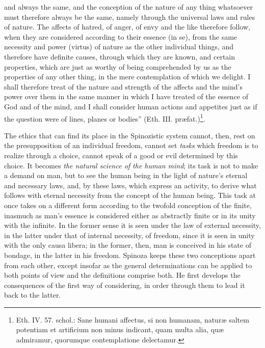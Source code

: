 \documentclass[12pt,a4paper,openany]{book}
\newcommand{\opage}[1]{\marginnote{\footnotesize\textit{[#1]}}}
\begin{document}
and always the same, and the conception of the nature of any thing
whatsoever must therefore always be the same, namely
through the universal laws and rules of nature. The affects of hatred, of anger,
of envy and the like therefore follow, when they are considered
according to their essence (in se), from the same necessity
and power (virtus) of nature as the other individual things,
and therefore have definite causes, through which they are known,
and certain properties, which are just as worthy of being comprehended
by us as the properties of any other thing, in the mere
contemplation of which we delight. I shall therefore treat of the
\opage{110}\setcounter{footnote}{0}nature and strength of the affects and the mind's power over them in the same
manner in which I have treated of the essence of God and of the mind,
and I shall consider human actions and
appetites just as if the question were of lines, planes or
bodies'' (Eth. III. præfat.)\footnote{Eth. IV. 57. schol.: Sane
humani affectus, si non humanam, naturæ saltem potentiam et
artificium non minus indicant, quam multa alia, quæ
admiramur, quorumque contemplatione delectamur.}.

The ethics that can find its place in the Spinozistic
system cannot, then, rest on the presupposition of an
individual freedom, cannot set \emph{tasks} which freedom
is to realize through a choice, cannot speak of a good or evil determined by this
choice. It becomes \emph{the natural science of the
human mind}; its task is not to make
a demand on man, but to see the human
being in the light of nature's eternal and necessary laws, and, by
these laws, which express an activity, to derive what
follows with eternal necessity from the concept of the human
being. This task at once takes on a different
form according to the twofold conception of the finite, inasmuch as
man's essence is considered either as abstractly finite
or in its unity with the infinite. In the former sense it is seen
under the law of external necessity, in the latter under that of
internal necessity, of freedom, since it is seen in unity with
the only causa libera; in the former, then, man is conceived in
his state of bondage, in the latter in his freedom. Spinoza keeps
these two conceptions apart from each other, except
insofar as the general determinations can be applied
to both points of view and the definitions comprise both.
He first develops the consequences of the first
way of considering, in order through them to lead it back to
the latter.
\end{document}
